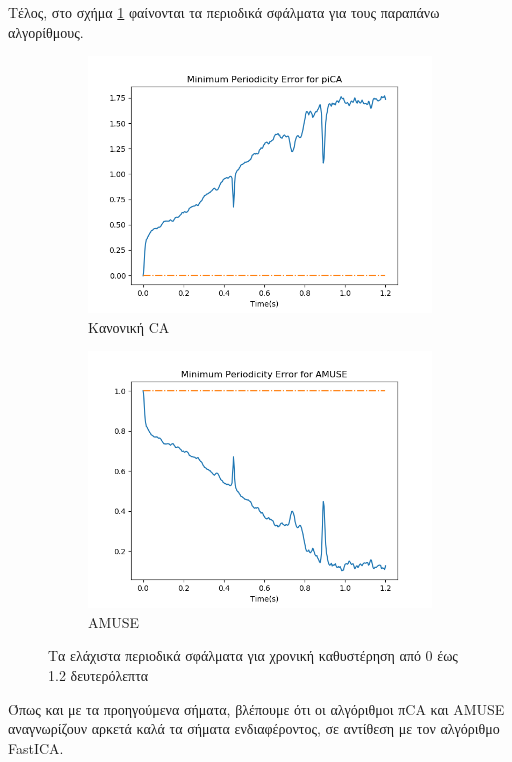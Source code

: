 \noindent Τέλος, στο σχήμα \ref{fig:5.34} φαίνονται τα περιοδικά σφάλματα για τους παραπάνω αλγορίθμους.
\begin{figure}[H]
    \centering
    \begin{subfigure}[b]{0.48 \textwidth}
        \centering
       \includegraphics[width=\textwidth]{daisy/pica_error.png}\en
        \caption{\gr Κανονική \en \pi CA} \gr
    \end{subfigure}
    \hfill
    \begin{subfigure}[b]{0.48 \textwidth}
        \centering
        \includegraphics[width=\textwidth]{daisy/amuse_error.png}\en
        \caption{AMUSE} \gr
    \end{subfigure}
    \gr
    \caption{Τα ελάχιστα περιοδικά σφάλματα για χρονική καθυστέρηση από 0 έως 1.2 δευτερόλεπτα}
    \label{fig:5.34}
\end{figure}
\noindent Όπως και με τα προηγούμενα σήματα, βλέπουμε ότι οι αλγόριθμοι π\en CA \gr και \en AMUSE \gr αναγνωρίζουν αρκετά καλά τα σήματα ενδιαφέροντος, σε αντίθεση με τον αλγόριθμο \en FastICA. \gr
